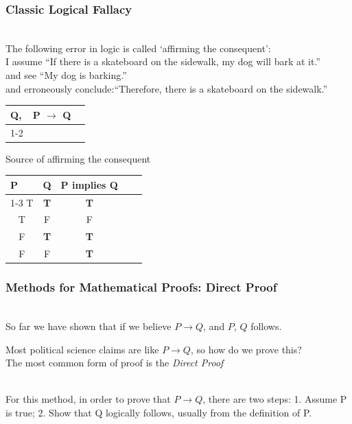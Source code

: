 \documentclass[aspectratio=169]{beamer}
\numberwithin{equation}{section}
\begin{document}
\begin{frame}
\frametitle{Classic Logical Fallacy}

\ \\The following error in logic is called `affirming the consequent':\pause
\ \\I assume ``If there is a skateboard on the sidewalk, my dog will bark at it.''
\ \\and see ``My dog is barking.''\pause
\ \\and erroneously conclude:``Therefore, there is a skateboard on the sidewalk.''\pause

\begin{table}
\begin{tabular}{ccl}
\multicolumn{1}{l}{Q,} & \multicolumn{1}{l}{P $\rightarrow$ Q} &  \\ \cline{1-2}
\multicolumn{2}{c}{$P\ \lor \sim P$}                                    &  \\
\end{tabular}
\end{table} 
\end{frame}

\begin{frame}{Source of affirming the consequent}

\begin{table}
\begin{tabular}{cccll}
\multicolumn{1}{l}{P} & \multicolumn{1}{l}{Q} & \multicolumn{1}{l}{P implies Q} &  &  \\ \cline{1-3}
T                  & \textbf{T}                      & \textbf{T}                              &  &  \\
T                   & F                     & F                               &  &  \\
F                     & \textbf{T}                      & \textbf{T}                                &  &  \\
F                     & F                     & \textbf{T}                               &  & 
\end{tabular}
\end{table} 
\end{frame}


\begin{frame}
\frametitle{Methods for Mathematical Proofs: Direct Proof}

\ \\So far we have shown that if we believe $P \rightarrow Q$, and $P$, $Q$ follows.

Most political science claims are like $P \rightarrow Q$, so how do we prove this?  \\

The most common form of proof is the \emph{Direct Proof} \pause

\ \\For this method, in order to prove that $P \rightarrow Q$, there are two steps: 1. Assume P is true; 2. Show that Q logically follows, usually from the definition of P. 

\end{frame}
\end{document}

